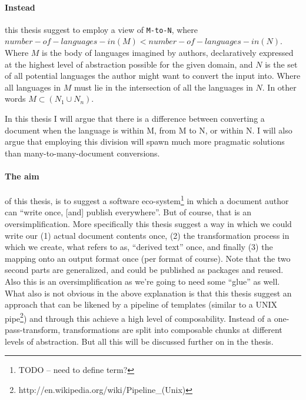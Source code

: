 \documentclass{scrreprt}
\begin{document}
\paragraph{Instead} this thesis suggest to employ a view of \texttt{M-to-N}, where \(number-of-languages-in(M) < number-of-languages-in(N)\). Where \(M\) is the body of  languages imagined by authors, declaratively expressed at the highest level of abstraction possible for the given domain, and \(N\) is the set of all potential languages the author might want to convert the input into. Where all languages in \(M\) must lie in the intersection of all the languages in \(N\). In other words \texttt{\(M \subset (N_1 \cup N_n) \)}. 

In this thesis I will argue that there is a difference between converting a document when the language is within M, from M to N, or within N. I will also argue that employing this division will spawn much more pragmatic solutions than many-to-many-document conversions.

\paragraph{The aim} of this thesis, is to suggest a software eco-system\footnote{TODO -- need to define term?} in which a document author can ``write once, [and] publish everywhere''. But of course, that is an oversimplification. More specifically this thesis suggest a way in which we could write our (1) actual document contents once, (2) the transformation process in which we create, what \citet{reid} refers to as, ``derived text'' once, and finally (3) the mapping onto an output format once (per format of course). Note that the two second parts are generalized, and could be published as packages and reused. Also this is an oversimplification as we're going to need some ``glue'' as well. What also is not obvious in the above explanation is that this thesis suggest an approach that can be likened by a pipeline of templates (similar to a UNIX pipe\footnote{http://en.wikipedia.org/wiki/Pipeline\_(Unix)}) and through this achieve a high level of composability. Instead of a one-pass-transform, transformations are split into composable chunks at different levels of abstraction. But all this will be discussed further on in the thesis.






\end{document}
